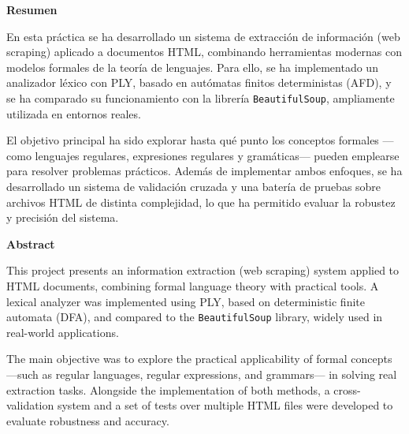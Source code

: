 \documentclass[11pt,a4paper]{article}
\begin{document}
\newpage
\large
\tableofcontents
\thispagestyle{empty}
\newpage
\normalsize

\cleardoublepage
{}
\setcounter{page}{1}
\fancyfoot[C]{\raisebox{-10pt}{\thepage}}



\begin{minipage}[t]{0.48\textwidth}
\raggedright
\textbf{Resumen}
\vspace{0.5em}

En esta práctica se ha desarrollado un sistema de extracción de información (web scraping) aplicado a documentos HTML, combinando herramientas modernas con modelos formales de la teoría de lenguajes. Para ello, se ha implementado un analizador léxico con PLY, basado en autómatas finitos deterministas (AFD), y se ha comparado su funcionamiento con la librería \texttt{BeautifulSoup}, ampliamente utilizada en entornos reales.

\vspace{0.5em}

El objetivo principal ha sido explorar hasta qué punto los conceptos formales —como lenguajes regulares, expresiones regulares y gramáticas— pueden emplearse para resolver problemas prácticos. Además de implementar ambos enfoques, se ha desarrollado un sistema de validación cruzada y una batería de pruebas sobre archivos HTML de distinta complejidad, lo que ha permitido evaluar la robustez y precisión del sistema.
\end{minipage}
\hfill
\begin{minipage}[t]{0.48\textwidth}
\raggedright
\textbf{Abstract}
\vspace{0.5em}

This project presents an information extraction (web scraping) system applied to HTML documents, combining formal language theory with practical tools. A lexical analyzer was implemented using PLY, based on deterministic finite automata (DFA), and compared to the \texttt{BeautifulSoup} library, widely used in real-world applications.

\vspace{0.5em}

The main objective was to explore the practical applicability of formal concepts —such as regular languages, regular expressions, and grammars— in solving real extraction tasks. Alongside the implementation of both methods, a cross-validation system and a set of tests over multiple HTML files were developed to evaluate robustness and accuracy.
\end{minipage}
\end{document}
